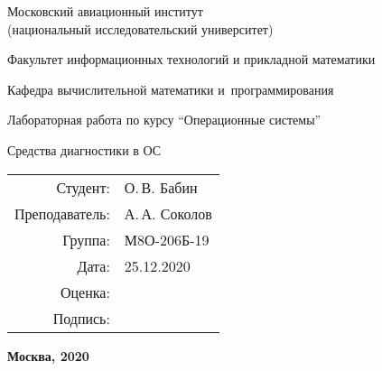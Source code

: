 \begin{titlepage}
\begin{center}
\bfseries

{\Large Московский авиационный институт\\ (национальный исследовательский университет)}

\vspace{48pt}

{\large Факультет информационных технологий и прикладной математики
}

{\large Кафедра вычислительной математики и~программирования}


\vspace{48pt}

Лабораторная работа  по курсу \enquote{Операционные системы}

\vspace{24pt}

{\Large Средства диагностики в ОС}

\end{center}

\vspace{72pt}

\begin{flushright}
\begin{tabular}{rl}
Студент: & О.\,В. Бабин \\
Преподаватель: & А.\,А. Соколов  \\
Группа: & М8О-206Б-19 \\
Дата: & 25.12.2020 \\
Оценка: & \\
Подпись: & \\
\end{tabular}
\end{flushright}

\vfill

\begin{center}
\bfseries
Москва, 2020
\end{center}
\end{titlepage}

\pagebreak
